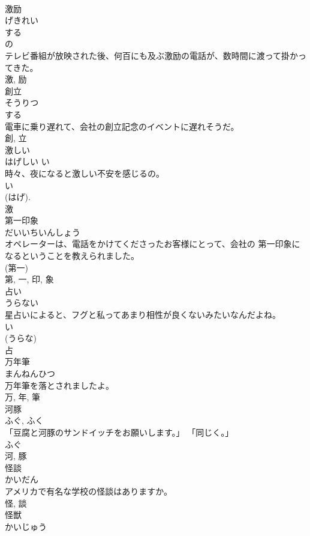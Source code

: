 \documentclass[8pt]{extreport}
\begin{document}
\begin{CJK}{UTF8}{min}
\\	激励	
\\	げきれい	
\\	する 
\\	の 
\\	テレビ番組が放映された後、何百にも及ぶ激励の電話が、数時間に渡って掛かってきた。	
\\	激, 励	
\\	創立	
\\	そうりつ	
\\	する 
\\	電車に乗り遅れて、会社の創立記念のイベントに遅れそうだ。	
\\	創, 立	
\\	激しい	
\\	はげしい	い 
\\	時々、夜になると激しい不安を感じるの。	
\\	い 
\\	(はげ). 
\\	激	
\\	第一印象	
\\	だいいちいんしょう	
\\	オペレーターは、電話をかけてくださったお客様にとって、会社の 第一印象になるということを教えられました。	
\\	(第一) 
\\	第, 一, 印, 象	
\\	占い	
\\	うらない	
\\	星占いによると、フグと私ってあまり相性が良くないみたいなんだよね。	
\\	い 
\\	(うらな) 
\\	占	
\\	万年筆	
\\	まんねんひつ	
\\	万年筆を落とされましたよ。	
\\	万, 年, 筆	
\\	河豚	
\\	ふぐ, ふく	
\\	「豆腐と河豚のサンドイッチをお願いします。」 「同じく。」	
\\	ふぐ 
\\	河, 豚	
\\	怪談	
\\	かいだん	
\\	アメリカで有名な学校の怪談はありますか。	
\\	怪, 談	
\\	怪獣	
\\	かいじゅう	

\end{CJK}
\end{document}
